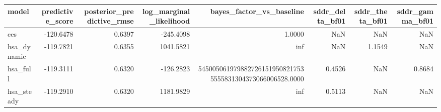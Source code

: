 \begin{tabular}{lrrrrrrr}
\toprule
model & predictive\_score & posterior\_predictive\_rmse & log\_marginal\_likelihood & bayes\_factor\_vs\_baseline & sddr\_delta\_bf01 & sddr\_theta\_bf01 & sddr\_gamma\_bf01 \\
\midrule
ces & -120.6478 & 0.6397 & -245.4098 & 1.0000 & NaN & NaN & NaN \\
hsa\_dynamic & -119.7821 & 0.6355 & 1041.5821 & inf & NaN & 1.1549 & NaN \\
hsa\_full & -119.3111 & 0.6320 & -126.2823 & 5450050619798827261519508217535555831304373066006528.0000 & 0.4526 & NaN & 0.8684 \\
hsa\_steady & -119.2910 & 0.6320 & 1181.9829 & inf & 0.5113 & NaN & NaN \\
\bottomrule
\end{tabular}
